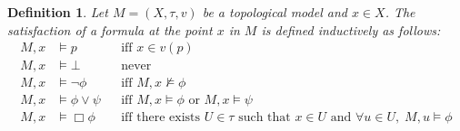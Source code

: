 \documentclass[12pt, a4paper]{scrartcl}
\newtheorem{definition}{Definition}[subsection]
\begin{document}
\begin{definition}
Let \( M = (X,\tau,v) \) be a topological model and \( x \in X \).  
The satisfaction of a formula at the point \( x \) in \( M \) is defined inductively as follows:
\[
\begin{aligned}
    M, x &\vDash p &&\text{iff } x \in v(p) \\
    M, x &\vDash \bot &&\text{never} \\
    M, x &\vDash \neg \phi &&\text{iff } M, x \nvDash \phi \\
    M, x &\vDash \phi \lor \psi &&\text{iff } M, x \vDash \phi \text{ or } M, x \vDash \psi \\
    M, x &\vDash \Box \phi &&\text{iff there exists } U \in \tau \text{ such that } x \in U \text{ and } \forall u \in U,\; M, u \vDash \phi
\end{aligned}
\]
\end{definition}
\end{document}
